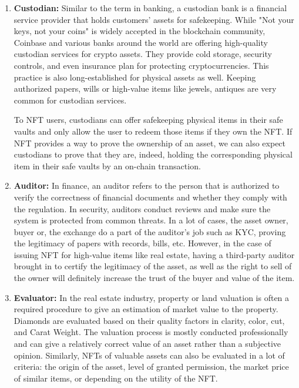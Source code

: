 \documentclass[12pt]{article}
\begin{document}
\begin{enumerate}
    \item \textbf{Custodian:} Similar to the term in banking, a custodian bank is a financial service provider that holds customers' assets for safekeeping. While "Not your keys, not your coins" is widely accepted in the blockchain community, Coinbase and various banks around the world are offering high-quality custodian services for crypto assets. They provide cold storage, security controls, and even insurance plan for protecting cryptocurrencies. This practice is also long-established for physical assets as well. Keeping authorized papers, wills or high-value items like jewels, antiques are very common for custodian services.
    
    To NFT users, custodians can offer safekeeping physical items in their safe vaults and only allow the user to redeem those items if they own the NFT. If NFT provides a way to prove the ownership of an asset, we can also expect custodians to prove that they are, indeed, holding the corresponding physical item in their safe vaults by an on-chain transaction.
    
    \item \textbf{Auditor:} In finance, an auditor refers to the person that is authorized to verify the correctness of financial documents and whether they comply with the regulation. In security, auditors conduct reviews and make sure the system is protected from common threats. In a lot of cases, the asset owner, buyer or, the exchange do a part of the auditor's job such as KYC, proving the legitimacy of papers with records, bills, etc. However, in the case of issuing NFT for high-value items like real estate, having a third-party auditor brought in to certify the legitimacy of the asset, as well as the right to sell of the owner will definitely increase the trust of the buyer and value of the item.
    
    \item \textbf{Evaluator:} In the real estate industry, property or land valuation is often a required procedure to give an estimation of market value to the property. Diamonds are evaluated based on their quality factors in clarity, color, cut, and Carat Weight. The valuation process is mostly conducted professionally and can give a relatively correct value of an asset rather than a subjective opinion. Similarly, NFTs of valuable assets can also be evaluated in a lot of criteria: the origin of the asset, level of granted permission, the market price of similar items, or depending on the utility of the NFT.
    

\end{enumerate}
\end{document}
